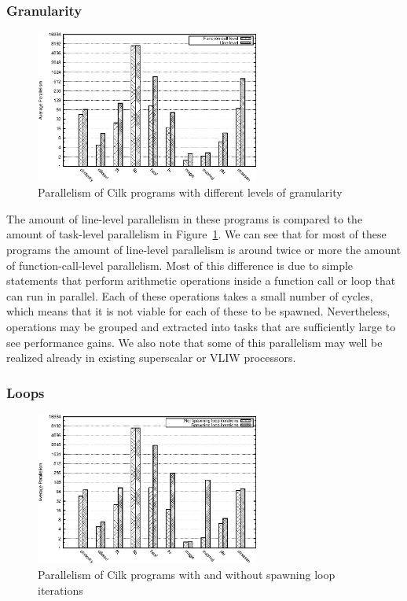\subsubsection{Granularity}

\begin{figure}
 \centering
 \includegraphics[width=2.9in]{cilk-gran}
 \caption{Parallelism of Cilk programs with different levels of granularity}
 \label{cilk-gran}
\end{figure}

The amount of line-level parallelism in these programs is compared to the amount of task-level parallelism in Figure~\ref{cilk-gran}.
We can see that for most of these programs the amount of line-level parallelism is around twice or more the amount of function-call-level parallelism.
Most of this difference is due to simple statements that perform arithmetic operations inside a function call or loop that can run in parallel.
Each of these operations takes a small number of cycles, which means that it is not viable for each of these to be spawned.
Nevertheless, operations may be grouped and extracted into tasks that are sufficiently large to see performance gains.
We also note that some of this parallelism may well be realized already in existing superscalar or VLIW processors.

\subsubsection{Loops}

\begin{figure}
 \centering
 \includegraphics[width=2.9in]{cilk-loop}
 \caption{Parallelism of Cilk programs with and without spawning loop iterations}
 \label{cilk-loop}
\end{figure}

